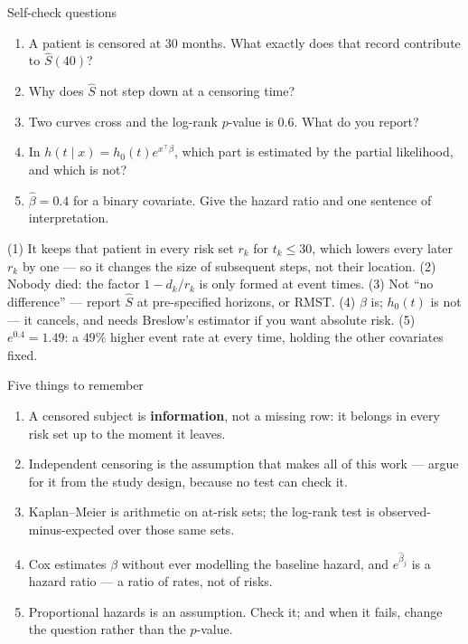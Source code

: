 \documentclass[aspectratio=169,11pt]{beamer}
\begin{document}
\begin{frame}{Self-check questions}
  \footnotesize
  \begin{readme}
    \begin{enumerate}
      \item A patient is censored at $30$ months. What exactly does that record contribute
            to $\hat S(40)$?
      \item Why does $\hat S$ not step down at a censoring time?
      \item Two curves cross and the log-rank $p$-value is $0.6$. What do you report?
      \item In $h(t\mid x)=h_0(t)e^{x^\top\beta}$, which part is estimated by the partial
            likelihood, and which is not?
      \item $\hat\beta=0.4$ for a binary covariate. Give the hazard ratio and one
            sentence of interpretation.
    \end{enumerate}
  \end{readme}
  \begin{takeaway}[Answers]
    (1) It keeps that patient in every risk set $r_k$ for $t_k\le 30$, which lowers every
    later $r_k$ by one --- so it changes the size of subsequent steps, not their location.
    (2) Nobody died: the factor $1-d_k/r_k$ is only formed at event times.
    (3) Not ``no difference'' --- report $\hat S$ at pre-specified horizons, or RMST.
    (4) $\beta$ is; $h_0(t)$ is not --- it cancels, and needs Breslow's estimator if you
    want absolute risk.
    (5) $e^{0.4}=1.49$: a $49\%$ higher event rate at every time, holding the other
    covariates fixed.
  \end{takeaway}
\end{frame}

\begin{frame}{Five things to remember}
  \begin{takeaway}
    \begin{enumerate}
      \item A censored subject is \textbf{information}, not a missing row: it belongs in
            every risk set up to the moment it leaves.
      \item Independent censoring is the assumption that makes all of this work ---
            argue for it from the study design, because no test can check it.
      \item Kaplan--Meier is arithmetic on at-risk sets; the log-rank test is
            observed-minus-expected over those same sets.
      \item Cox estimates $\beta$ without ever modelling the baseline hazard, and
            $e^{\hat\beta_j}$ is a hazard ratio --- a ratio of rates, not of risks.
      \item Proportional hazards is an assumption. Check it; and when it fails, change
            the question rather than the $p$-value.
    \end{enumerate}
  \end{takeaway}
\end{frame}
\end{document}

